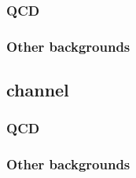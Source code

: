 \subsubsection{QCD}
\label{sec:mssm_bkgs_tt_qcd}

\subsubsection{\texorpdfstring{\Wjets}{W+jets}}
\label{sec:mssm_bkgs_tt_wjets}

\subsubsection{\texorpdfstring{\ttbar}{ttbar}}
\label{sec:mssm_bkgs_tt_tt}

\subsubsection{Other backgrounds}
\label{sec:mssm_bkgs_tt_other}

\subsection{\texorpdfstring{\emu channel}{emu channel}}
\label{sec:mssm_bkgs_em}

\subsubsection{\texorpdfstring{\Ztautau}{Z to tau tau}}
\label{sec:mssm_bkgs_em_ztt}

\subsubsection{QCD}
\label{sec:mssm_bkgs_em_qcd}

\subsubsection{\texorpdfstring{\Wjets}{W+jets}}
\label{sec:mssm_bkgs_em_wjets}

\subsubsection{\texorpdfstring{\ttbar}{ttbar}}
\label{sec:mssm_bkgs_em_tt}

\subsubsection{Other backgrounds}
\label{sec:mssm_bkgs_em_other}


